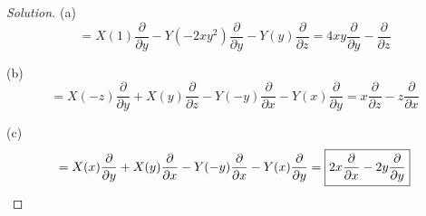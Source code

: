 \documentclass[10pt]{article}
\newenvironment{soln}{\begin{proof}[Solution]}{\end{proof}}
\begin{document}
\begin{soln}
    (a) \begin{equation*}
	[X,Y] = X(1)\frac\partial{\partial y}
	- Y(-2xy^2)\frac\partial{\partial y}
	- Y(y)\frac\partial{\partial z}
	= \boxed{4xy\frac\partial{\partial y} - \frac\partial{\partial z}}
    \end{equation*}

    (b) \begin{equation*}
	[X,Y] = X(-z)\frac\partial{\partial y}
	+ X(y)\frac\partial{\partial z}
	- Y(-y)\frac\partial{\partial x}
	- Y(x)\frac\partial{\partial y}
	= \boxed{x\frac\partial{\partial z} - z\frac\partial{\partial x}}
    \end{equation*}

    (c) \begin{equation*}
	[X,Y] = X(x)\frac\partial{\partial y}
	+ X(y)\frac\partial{\partial x}
	- Y(-y)\frac\partial{\partial x}
	- Y(x)\frac\partial{\partial y}
	= \boxed{2x\frac\partial{\partial x} - 2y\frac\partial{\partial y}}
	\qedhere
    \end{equation*}
\end{soln}
\end{document}
